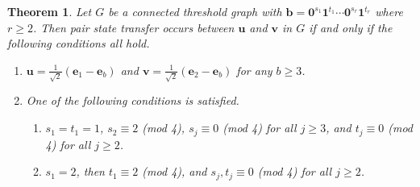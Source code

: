 \documentclass[preprint]{elsarticle}
\newtheorem{theorem}{Theorem}[section]
\begin{document}
\begin{theorem}
\label{pairthresh}
Let $G$ be a connected threshold graph with $\mathbf{b}=\mathbf{0}^{s_1}\mathbf{1}^{t_1}\cdots \mathbf{0}^{s_r}\mathbf{1}^{t_r}$ where $r\geq 2$. Then pair state transfer occurs between $\mathbf{u}$ and $\mathbf{v}$ in $G$ if and only if the following conditions all hold.
\begin{enumerate}
\item $\mathbf{u}=\frac{1}{\sqrt2}(\mathbf{e}_1-\mathbf{e}_b)$ and $\mathbf{v}=\frac{1}{\sqrt2}(\mathbf{e}_2-\mathbf{e}_b)$ for any $b\geq 3$.
\item One of the following conditions is satisfied.
\begin{enumerate}
\item $s_1=t_1=1$, $s_2\equiv 2$ (mod 4), $s_j\equiv 0$ (mod 4) for all $j\geq 3$, and $t_j\equiv 0$ (mod 4) for all $j\geq 2$.
\item $s_1=2$, then $t_1\equiv 2$ (mod 4), and $s_j,t_j\equiv 0$ (mod 4) for all $j\geq 2$.
\end{enumerate}
\end{enumerate}
\end{theorem}
\end{document}
